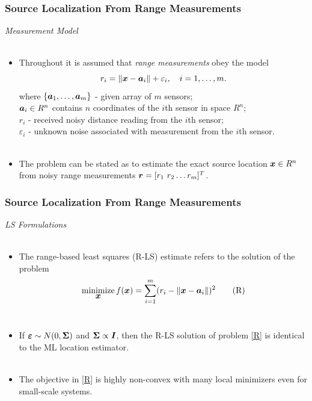 \documentclass [t] {beamer} %
\begin{document}
\begin{frame} %
\frametitle{Source Localization From Range Measurements}
{\large \textit{Measurement Model}} \\~\\
\normalsize
\begin{itemize}
\item 
Throughout it is assumed that \textit{range measurements} obey the model
\begin{equation} 
\nonumber
r_i = \|{\mbox{\boldmath$x$}} - {\mbox{\boldmath$a$}}_i\| + \varepsilon_i, \quad i = 1, \ldots , m.
\end{equation}  
where $\{\mbox{\boldmath$a$}_1,\ldots, \mbox{\boldmath$a$}_m\}$ - given array of $m$ sensors;\\
$\mbox{\boldmath$a$}_i\in R^n$  contains $n$ coordinates of the $i$th sensor in space $R^n$; \\
$r_i$ - received noisy distance reading from the $i$th sensor; \\
$\varepsilon_i$ - unknown noise associated with measurement from the $i$th sensor. 
\\~\\
\item
The problem can be stated as to estimate the exact source location $\mbox{\boldmath$x$} \in R^n$ from noisy range measurements $\mbox{\boldmath$r$} = [r_1 \ r_2 \ldots r_m]^T$.
\end{itemize}
\end{frame}



\begin{frame} %
\frametitle{Source Localization From Range Measurements}
{\large \textit{LS Formulations}} \\~\\
\normalsize
\begin{itemize}
\item 
The range-based least squares (R-LS) estimate refers to the solution of the problem
\begin{equation} \label{R} 
\mathop{\mbox{minimize}}_{\mbox{\boldmath$x$}} f(\mbox{\boldmath$x$})=\sum_{i=1}^{m} (r_i - \|{\mbox{\boldmath$x$}} - {\mbox{\boldmath$a$}}_i\|)^2	\tag{R}
\end{equation} \\
\item If $\mbox{\boldmath${\varepsilon}$} \sim N(0,\mbox{\boldmath${\Sigma}$}) $ and $\mbox{\boldmath${\Sigma}$} \propto \mbox{\boldmath$I$}$, then the R-LS solution of problem \eqref{R} is identical to the ML location estimator. \\ ~\\
\item  The objective in \eqref{R} is highly non-convex with many local minimizers even for small-scale systems.

\end{itemize}
\end{frame}
\end{document}

